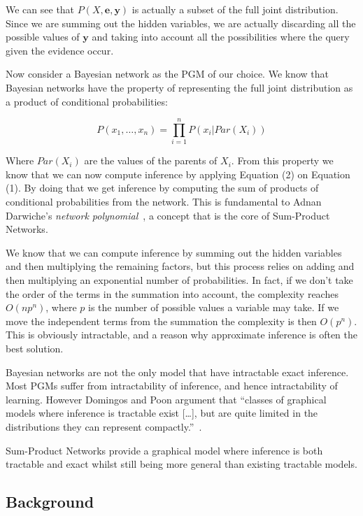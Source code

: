 \documentclass[a4paper,10pt]{article}
\theoremstyle{plain}
\begin{document}
We can see that $P(X,\mathbf{e},\mathbf{y})$ is actually a subset of the full joint distribution.
Since we are summing out the hidden variables, we are actually discarding all the possible values
of $\mathbf{y}$ and taking into account all the possibilities where the query given the evidence
occur.

Now consider a Bayesian network as the PGM of our choice. We know that Bayesian networks have the
property of representing the full joint distribution as a product of conditional probabilities:

\begin{equation}
  P(x_1,\ldots,x_n) = \prod_{i=1}^n P(x_i|Par(X_i))
\end{equation}

Where $Par(X_i)$ are the values of the parents of $X_i$. From this property we know that we can
now compute inference by applying Equation (2) on Equation (1). By doing that we get inference by
computing the sum of products of conditional probabilities from the network. This is fundamental
to Adnan Darwiche's \textit{network polynomial}~\cite{diff-approach-darwiche,bayes-net-darwiche},
a concept that is the core of Sum-Product Networks.

We know that we can compute inference by summing out the hidden variables and then multiplying the
remaining factors, but this process relies on adding and then multiplying an exponential number of
probabilities. In fact, if we don't take the order of the terms in the summation into account, the
complexity reaches $O(np^n)$, where $p$ is the number of possible values a variable may take. If we
move the independent terms from the summation the complexity is then $O(p^n)$. This is obviously
intractable, and a reason why approximate inference is often the best solution.

Bayesian networks are not the only model that have intractable exact inference. Most PGMs suffer
from intractability of inference, and hence intractability of learning. However Domingos and Poon
argument that ``classes of graphical models where inference is tractable exist [\ldots], but are
quite limited in the distributions they can represent compactly.''~\cite{poon-domingos}.

Sum-Product Networks provide a graphical model where inference is both tractable and exact whilst
still being more general than existing tractable models.

\subsection{Background}
\end{document}
